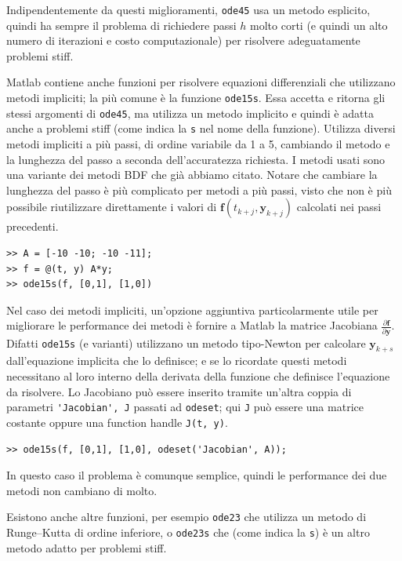 \documentclass[a4paper]{report}
\theoremstyle{definition}
\theoremstyle{remark}
\newcommand{\y}{\mathbf{y}}
\newcommand{\f}{\mathbf{f}}
\newcommand{\checkkey}[1]{%
        \ifstrequal{#1}{inf}{\setbool{showcontent}{true}}{}%
    }
\newenvironment{conditional}[1][]{%
        \setbool{showcontent}{false}%
        \forcsvlist\checkkey{#1}%
        \ifbool{showcontent}{\begingroup}{\expandafter\comment}%
    }{%
        \ifbool{showcontent}{\endgroup}{\expandafter\endcomment}%
    }
\newcommand{\checkkey}[1]{%
        \ifstrequal{#1}{ich}{\setbool{showcontent}{true}}{}%
    }
\newenvironment{conditional}[1][]{%
        \setbool{showcontent}{false}%
        \forcsvlist\checkkey{#1}%
        \ifbool{showcontent}{\begingroup}{\expandafter\comment}%
    }{%
        \ifbool{showcontent}{\endgroup}{\expandafter\endcomment}%
    }
\begin{document}
\begin{conditional}[ich]
Indipendentemente da questi miglioramenti, \lstinline{ode45} usa un metodo esplicito, quindi ha sempre il problema di richiedere passi $h$ molto corti (e quindi un alto numero di iterazioni e costo computazionale) per risolvere adeguatamente problemi stiff.

Matlab contiene anche funzioni per risolvere equazioni differenziali che utilizzano metodi impliciti; la più comune è la funzione \lstinline{ode15s}. Essa accetta e ritorna gli stessi argomenti di \lstinline{ode45}, ma utilizza un metodo implicito e quindi è adatta anche a problemi stiff (come indica la \lstinline{s} nel nome della funzione). Utilizza diversi metodi impliciti a più passi, di ordine variabile da 1 a 5, cambiando il metodo e la lunghezza del passo a seconda dell'accuratezza richiesta. I metodi usati sono una variante dei metodi BDF che già abbiamo citato. Notare che cambiare la lunghezza del passo è più complicato per metodi a più passi, visto che non è più possibile riutilizzare direttamente i valori di $\f(t_{k+j},\y_{k+j})$ calcolati nei passi precedenti.

\begin{lstlisting}
>> A = [-10 -10; -10 -11];
>> f = @(t, y) A*y;
>> ode15s(f, [0,1], [1,0])
\end{lstlisting}

Nel caso dei metodi impliciti, un'opzione aggiuntiva particolarmente utile per migliorare le performance dei metodi è fornire a Matlab la matrice Jacobiana $\frac{\partial \f}{\partial \y}$. Difatti \lstinline{ode15s} (e varianti) utilizzano un metodo tipo-Newton per calcolare $\y_{k+s}$ dall'equazione implicita che lo definisce; e se lo ricordate questi metodi necessitano al loro interno della derivata della funzione che definisce l'equazione da risolvere. Lo Jacobiano può essere inserito tramite un'altra coppia di parametri \lstinline{'Jacobian', J} passati ad \lstinline{odeset}; qui \lstinline{J} può essere una matrice costante oppure una function handle \lstinline{J(t, y)}.

\begin{lstlisting}
>> ode15s(f, [0,1], [1,0], odeset('Jacobian', A));
\end{lstlisting}

In questo caso il problema è comunque semplice, quindi le performance dei due metodi non cambiano di molto.

Esistono anche altre funzioni, per esempio \lstinline{ode23} che utilizza un metodo di Runge--Kutta di ordine inferiore, o \lstinline{ode23s} che (come indica la \lstinline{s}) è un altro metodo adatto per problemi stiff.


\end{conditional}
\end{document}
